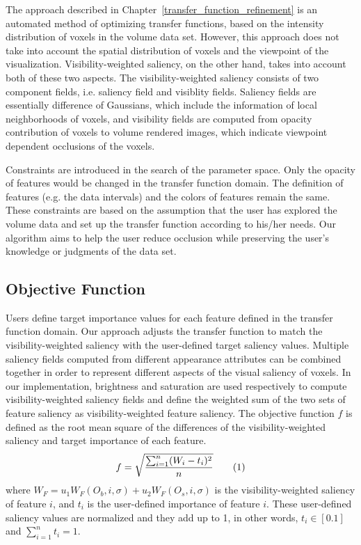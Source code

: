 The approach described in Chapter~\ref{transfer_function_refinement} is an automated method of optimizing transfer functions, based on the intensity distribution of voxels in the volume data set. However, this approach does not take into account the spatial distribution of voxels and the viewpoint of the visualization. Visibility-weighted saliency, on the other hand, takes into account both of these two aspects. The visibility-weighted saliency consists of two component fields, i.e. saliency field and visiblity fields. Saliency fields are essentially difference of Gaussians, which include the information of local neighborhoods of voxels, and visibility fields are computed from opacity contribution of voxels to volume rendered images, which indicate viewpoint dependent occlusions of the voxels.

Constraints are introduced in the search of the parameter space. Only the opacity of features would be changed in the transfer function domain. The definition of features (e.g. the data intervals) and the colors of features remain the same.
These constraints are based on the assumption that the user has explored the volume data and set up the transfer function according to his/her needs. Our algorithm aims to help the user reduce occlusion while preserving the user's knowledge or judgments of the data set.

\subsection{Objective Function}
Users define target importance values for each feature defined in the transfer function domain.
Our approach adjusts the transfer function to match the visibility-weighted saliency with the user-defined target saliency values.
Multiple saliency fields computed from different appearance attributes can be combined together in order to represent different aspects of the visual saliency of voxels.
In our implementation, brightness and saturation are used respectively to compute visibility-weighted saliency fields and define the weighted sum of the two sets of feature saliency as visibility-weighted feature saliency.
The objective function $ f $ is defined as the root mean square of the differences of the visibility-weighted saliency and target importance of each feature.
\[ f=\sqrt{ \frac{\sum_{i=1}^{n} (W_{i}-t_{i})^{2}}{n} } 
\addtag \]
where $ W_{F}=u_{1}W_{F}(O_{b},i,\sigma)+u_{2}W_{F}(O_{s},i,\sigma) $ is the visibility-weighted saliency of feature $ i $, and $ t_{i} $ is the user-defined importance of feature $ i $. These user-defined saliency values are normalized and they add up to 1, in other words, $ t_{i} \in [0.1] $ and $ \sum_{i=1}^{n} t_{i} = 1 $.

